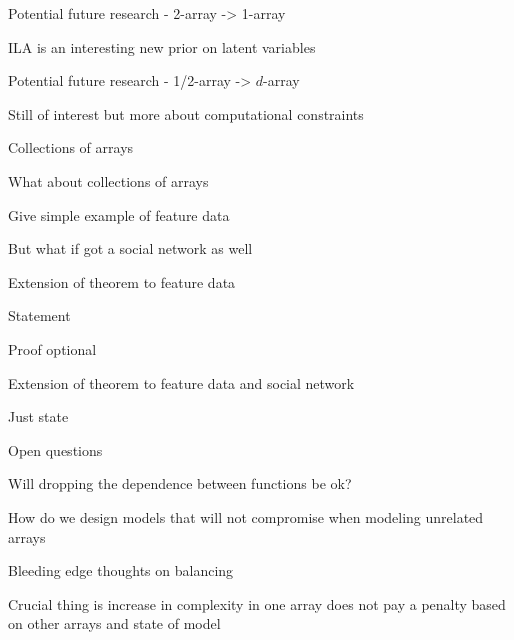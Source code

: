 \begin{frame}{Potential future research - 2-array -> 1-array}
  \begin{block}{}
    \eg ILA is an interesting new prior on latent variables
  \end{block}
\end{frame}

\begin{frame}{Potential future research - 1/2-array -> $d$-array}
  \begin{block}{}
    Still of interest but more about computational constraints
  \end{block}
\end{frame}

\begin{frame}{Collections of arrays}
  \begin{block}{}
    What about collections of arrays
    
    Give simple example of feature data
    
    But what if got a social network as well
  \end{block}
\end{frame}

\begin{frame}{Extension of theorem to feature data}
  \begin{block}{}
    Statement
    
    Proof optional
  \end{block}
\end{frame}

\begin{frame}{Extension of theorem to feature data and social network}
  \begin{block}{}
    Just state
  \end{block}
\end{frame}

\begin{frame}{Open questions}
  \begin{block}{}
    Will dropping the dependence between functions be ok?
    
    How do we design models that will not compromise when modeling unrelated arrays
  \end{block}
\end{frame}

\begin{frame}{Bleeding edge thoughts on balancing}
  \begin{block}{}
    Crucial thing is increase in complexity in one array does not pay a penalty based on other arrays and state of model
  \end{block}
\end{frame}

